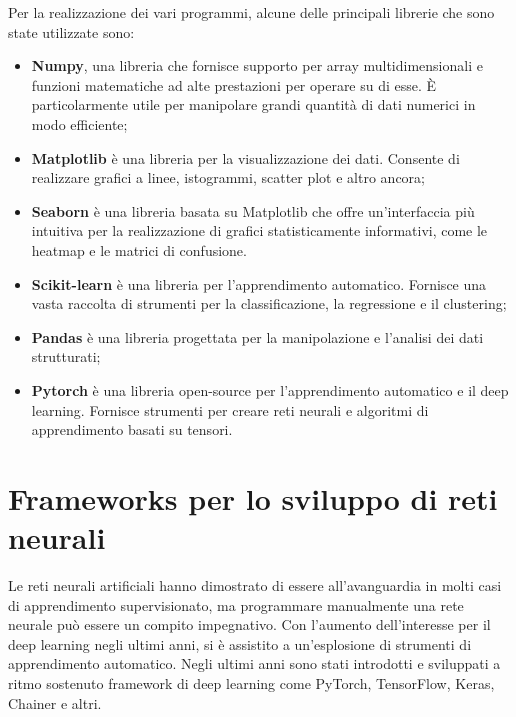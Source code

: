 Per la realizzazione dei vari programmi, alcune delle principali librerie che sono 
state utilizzate sono: %
\begin{itemize}
    \item \textbf{Numpy}, una libreria che fornisce supporto per array multidimensionali e 
    funzioni matematiche ad alte prestazioni per operare su di esse. 
    È particolarmente utile per manipolare grandi quantità di dati numerici in 
    modo efficiente;

    \item \textbf{Matplotlib} è una libreria per la visualizzazione dei dati. Consente di 
    realizzare grafici a linee, istogrammi, scatter plot e altro ancora;
    
    \item \textbf{Seaborn} è una libreria basata su Matplotlib che offre un'interfaccia più 
    intuitiva per la realizzazione di grafici statisticamente informativi, come le heatmap e 
    le matrici di confusione. 
    
    \item \textbf{Scikit-learn} è una libreria per l'apprendimento automatico. Fornisce una 
    vasta raccolta di strumenti per la classificazione, la regressione e il 
    clustering;

    \item \textbf{Pandas} è una libreria progettata per la manipolazione e l'analisi dei dati strutturati;
 
    \item \textbf{Pytorch} è una libreria open-source per l'apprendimento automatico e 
    il deep learning. Fornisce strumenti per creare reti neurali e algoritmi di 
    apprendimento basati su tensori.
\end{itemize}



\section{Frameworks per lo sviluppo di reti neurali}
Le reti neurali artificiali hanno dimostrato di essere all'avanguardia 
in molti casi di apprendimento supervisionato, ma programmare manualmente 
una rete neurale può essere un compito impegnativo. 
Con l'aumento dell'interesse per il deep learning negli ultimi anni, 
si è assistito a un'esplosione di strumenti di apprendimento automatico. 
Negli ultimi anni sono stati introdotti e sviluppati a ritmo sostenuto 
framework di deep learning come PyTorch, TensorFlow, Keras, Chainer e altri.

